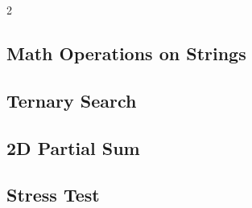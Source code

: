 \documentclass[10pt,a4paper]{extarticle}
\begin{document}
\begin{landscape}
\begin{multicols}{2}
\subsection{Math Operations on Strings}


\subsection{Ternary Search}


\subsection{2D Partial Sum}


\subsection{Stress Test}


\end{multicols}
\end{landscape}
\end{document}
